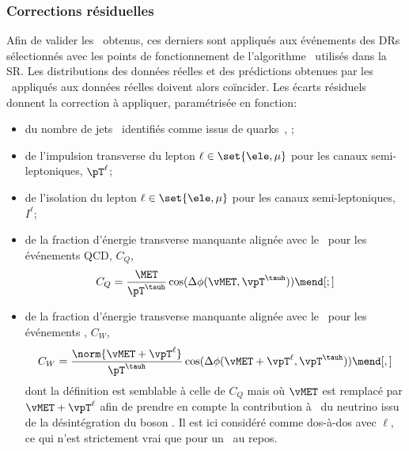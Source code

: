 \subsubsection{Corrections résiduelles}
Afin de valider les \fakefactors\ obtenus,
ces derniers sont appliqués aux événements des DRs
sélectionnés avec les points de fonctionnement de l'algorithme \DEEPTAU\
utilisés dans la SR.
Les distributions
des données réelles
et
des prédictions obtenues par les \fakefactors\ appliqués aux données réelles
doivent alors coïncider.
Les écarts résiduels donnent la correction à appliquer, paramétrisée en fonction:
\begin{itemize}
\item du nombre de jets \Nprebjets\ identifiés comme issus de quarks~\quarkb, \Nbjets;
\item de l'impulsion transverse du lepton $\ell\in\set{\ele,\mu}$ pour les canaux semi-leptoniques, $\pT^{\ell}$;
\item de l'isolation du lepton $\ell\in\set{\ele,\mu}$ pour les canaux semi-leptoniques, $I^{\ell}$;
\item de la fraction d'énergie transverse manquante alignée avec le \tauh\ pour les événements QCD, $C_Q$,
\begin{equation}
C_Q = \frac{\MET}{\pT^{\tauh}} \cos(\Delta\phi(\vMET, \vpT^{\tauh}))
\mend[;]
\label{eq-FF_CQ_def}
\end{equation}
\item de la fraction d'énergie transverse manquante alignée avec le \tauh\ pour les événements \Wjets, $C_W$,
\begin{equation}
C_W = \frac{\norm{\vMET + \vpT^{\ell}}}{\pT^{\tauh}} \cos(\Delta\phi(\vMET + \vpT^{\ell}, \vpT^{\tauh}))
\mend[,]
\label{eq-FF_CW_def}
\end{equation}
dont la définition est semblable à celle de $C_Q$ mais où $\vMET$ est remplacé par $\vMET + \vpT^{\ell}$ afin de prendre en compte la contribution à \MET\ du neutrino issu de la désintégration du boson \Wboson.
Il est ici considéré comme dos-à-dos avec $\ell$, ce qui n'est strictement vrai que pour un \Wboson\ au repos.
\end{itemize}
